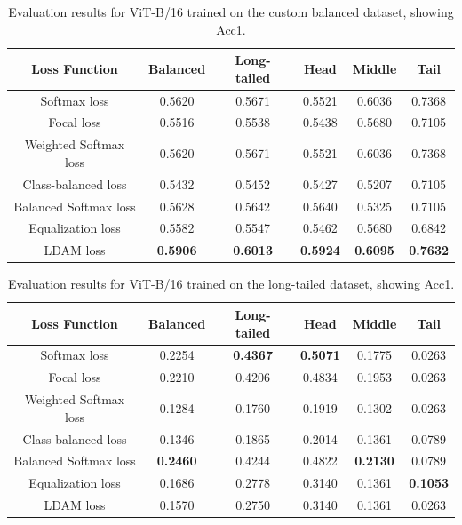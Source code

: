 \begin{table}[h!]
    \centering
    \caption{Evaluation results for ViT-B/16 trained on the custom balanced dataset, showing Acc1.}
    \small
    \begin{tabular}{cccccc}
        \toprule
        Loss Function & Balanced & Long-tailed & Head & Middle & Tail \\ 
        \midrule
        Softmax loss   & 0.5620 & 0.5671 & 0.5521 & 0.6036 & 0.7368 \\
        Focal loss   & 0.5516 & 0.5538 & 0.5438 & 0.5680 & 0.7105 \\
        Weighted Softmax loss   & 0.5620 & 0.5671 & 0.5521 & 0.6036 & 0.7368 \\
        Class-balanced loss   & 0.5432 & 0.5452 & 0.5427 & 0.5207 & 0.7105 \\
        Balanced Softmax loss   & 0.5628 & 0.5642 & 0.5640 & 0.5325 & 0.7105 \\
        Equalization loss   & 0.5582 & 0.5547 & 0.5462 & 0.5680 & 0.6842 \\
        LDAM loss   & \textbf{0.5906} &  \textbf{0.6013} & \textbf{0.5924} & \textbf{0.6095} & \textbf{0.7632} \\
        \bottomrule
    \end{tabular}
    \label{tab:vit_bal_acc1_1}
\end{table}


\begin{table}[h!]
    \centering
    \caption{Evaluation results for ViT-B/16 trained on the long-tailed dataset, showing Acc1.}
    \small
    \begin{tabular}{cccccc}
        \toprule
        Loss Function & Balanced & Long-tailed & Head & Middle & Tail \\ 
        \midrule
        Softmax loss   & 0.2254 & \textbf{0.4367} & \textbf{0.5071} & 0.1775 & 0.0263 \\
        Focal loss   & 0.2210 & 0.4206 & 0.4834 & 0.1953 & 0.0263 \\
        Weighted Softmax loss   & 0.1284 & 0.1760 & 0.1919 & 0.1302 & 0.0263 \\
        Class-balanced loss   & 0.1346 & 0.1865 & 0.2014 & 0.1361 & 0.0789 \\
        Balanced Softmax loss   & \textbf{0.2460} & 0.4244 & 0.4822 &  \textbf{0.2130} & 0.0789 \\
        Equalization loss   & 0.1686 & 0.2778 & 0.3140 & 0.1361 & \textbf{0.1053} \\
        LDAM loss   & 0.1570 & 0.2750 & 0.3140 & 0.1361 & 0.0263 \\
        \bottomrule
    \end{tabular}
    \label{tab:vit_lt_acc1}
\end{table}

